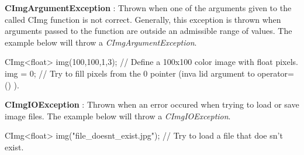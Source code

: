 \begin{DoxyItemize}
\item {\bfseries CImgArgumentException} : Thrown when one of the arguments given to the called CImg function is not correct. Generally, this exception is thrown when arguments passed to the function are outside an admissible range of values. The example below will throw a {\itshape CImgArgumentException\/}. 
\begin{DoxyCode}
      CImg<float> img(100,100,1,3);   // Define a 100x100 color image with float 
      pixels.
      img = 0;                     // Try to fill pixels from the 0 pointer (inva
      lid argument to operator=() ).
\end{DoxyCode}

\end{DoxyItemize}


\begin{DoxyItemize}
\item {\bfseries CImgIOException} : Thrown when an error occured when trying to load or save image files. The example below will throw a {\itshape CImgIOException\/}. 
\begin{DoxyCode}
      CImg<float> img("file_doesnt_exist.jpg");    // Try to load a file that doe
      sn't exist.
\end{DoxyCode}

\end{DoxyItemize}

